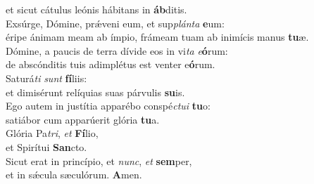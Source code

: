 \oddverse et sicut cátulus leónis hábitans in \textbf{áb}ditis.\\
\evenverse Exsúrge, Dómine, prǽveni eum, et sup\textit{plán}\textit{ta} \textbf{e}um:~\*\\
\evenverse éripe ánimam meam ab ímpio, frámeam tuam ab inimícis manus \textbf{tu}æ.\\
\oddverse Dómine, a paucis de terra dívide eos in vi\textit{ta} \textit{e}\textbf{ó}rum:~\*\\
\oddverse de abscónditis tuis adimplétus est venter e\textbf{ó}rum.\\
\evenverse Saturá\textit{ti} \textit{sunt} \textbf{fí}liis:~\*\\
\evenverse et dimisérunt relíquias suas párvulis \textbf{su}is.\\
\oddverse Ego autem in justítia apparébo conspé\textit{ctu}\textit{i} \textbf{tu}o:~\*\\
\oddverse satiábor cum apparúerit glória \textbf{tu}a.\\
\evenverse Glória Pa\textit{tri}, \textit{et} \textbf{Fí}lio,~\*\\
\evenverse et Spirítui \textbf{San}cto.\\
\oddverse Sicut erat in princípio, et \textit{nunc}, \textit{et} \textbf{sem}per,~\*\\
\oddverse et in sǽcula sæculórum. \textbf{A}men.\\
